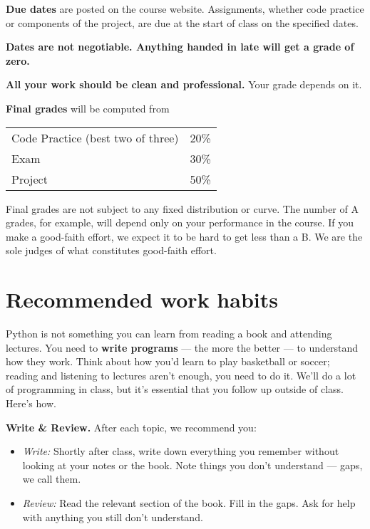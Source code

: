 \documentclass[11pt]{article}
\begin{document}
{\bf Due dates} are posted on the course website.
Assignments, whether code practice or components of the project,
are due at the start of class on the specified dates.

{\bf Dates are not negotiable.
Anything handed in late will get a grade of zero.\/}

{\bf All your work should be clean and professional.}  Your grade depends on it.

{\bf Final grades\/} will be computed from
\begin{center}
\begin{tabular}{ll}
Code Practice (best two of three) & 20\% \\
Exam        & 30\% \\
Project     & 50\% \\
\end{tabular}
\end{center}

Final grades are not subject to any fixed distribution or curve.
The number of A grades, for example,
will depend only on your performance in the course.
If you make a good-faith effort,
we expect it to be hard to get less than a B.
We are the sole judges of what constitutes good-faith effort.


\section*{Recommended work habits}

Python is not something you can learn from reading a book and attending lectures.
You need to {\bf write programs\/} ---
the more the better --- to understand how they work.
Think about how you'd learn to play basketball or soccer;
reading and listening to lectures aren't enough, you need to do it.
We'll do a lot of programming in class, but it's {essential\/} that you
follow up outside of class.
Here's how.

{\bf Write \& Review.\/}
After each topic, we recommend you:
%
\begin{itemize}
\item {\it Write:\/}  Shortly after class, write down everything you remember
without looking at your notes or the book. Note things you don't understand --- gaps, we call them.
\item {\it Review:\/} Read the relevant section of the book.  Fill in the gaps. Ask for help with anything you still don't understand.
\end{itemize}
%
\end{document}
